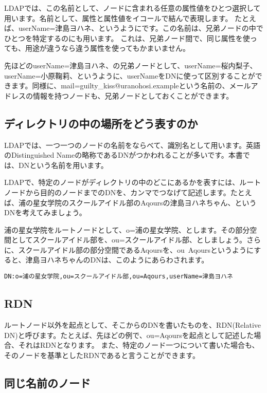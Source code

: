LDAPでは、この名前として、ノードに含まれる任意の属性値をひとつ選択して用います。名前として、属性と属性値をイコールで結んで表現します。
たとえば、userName=津島ヨハネ、というようにです。この名前は、兄弟ノードの中でひとつを特定するのにも用います。
これは、兄弟ノード間で、同じ属性を使っても、用途が違うなら違う属性を使ってもかまいません。

先ほどのuserName=津島ヨハネ、の兄弟ノードとして、userName=桜内梨子、userName=小原鞠莉、というように、userNameをDNに使って区別することができます。同様に、mail=guilty\_kiss@uranohosi.exampleという名前の、メールアドレスの情報を持つノードも、兄弟ノードとしておくことができます。

\subsection{ディレクトリの中の場所をどう表すのか}

LDAPでは、一つ一つのノードの名前をならべて、識別名として用います。英語のDistinguished Nameの略称であるDNがつかわれることが多いです。本書では、DNという名前を用います。

LDAPで、特定のノードがディレクトリの中のどこにあるかを表すには、ルートノードから目的のノードまでのDNを、カンマでつなげて記述します。たとえば、浦の星女学院のスクールアイドル部のAqoursの津島ヨハネちゃん、というDNを考えてみましょう。

浦の星女学院をルートノードとして、o=浦の星女学院、とします。その部分空間としてスクールアイドル部を、ou=スクールアイドル部、としましょう。さらに、スクールアイドル部の部分空間であるAqoursを、ou~Aqoursというようにすると、津島ヨハネちゃんのDNは、このようにあらわされます。

\begin{verbatim}
DN:o=浦の星女学院,ou=スクールアイドル部,ou=Aqours,userName=津島ヨハネ
\end{verbatim}

\subsection{RDN}

ルートノード以外を起点として、そこからのDNを書いたものを、RDN(Relative DN)と呼びます。たとえば、先ほどの例で、ou=Aqoursを起点として記述した場合、それはRDNとなります。
また、特定のノード一つについて書いた場合も、そのノードを基準としたRDNであると言うことができます。

\subsection{同じ名前のノード}

